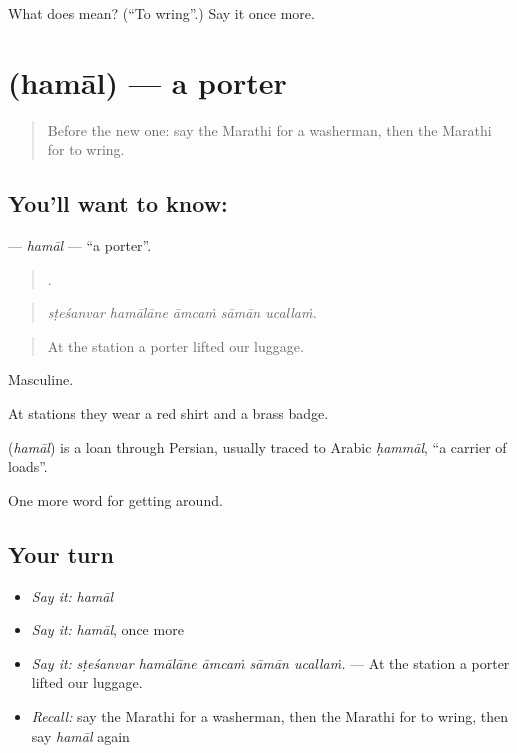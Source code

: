 \begin{tcolorbox}[breakable,colback=teal!4,colframe=teal!35!black,title={Before you move on}]
What does  mean? (\textquotedblleft{}To wring\textquotedblright{}.) Say it once more.
\end{tcolorbox}
\section[\texorpdfstring{\mr{हमाल} (hamāl)}{हमाल (hamāl)}]{ (hamāl) — a porter}

\label{lesson:MR-C416-hamal}



\begin{quote}
Before the new one: say the Marathi for a washerman, then the Marathi for to wring.
\end{quote}

\subsection*{You'll want to know: }
\textbf{} — \emph{hamāl} — \textquotedblleft{}a porter\textquotedblright{}.

\begin{quote}
    .
\end{quote}

\begin{quote}
\emph{sṭeśanvar hamālāne āmcaṁ sāmān ucallaṁ.}
\end{quote}

\begin{quote}
At the station a porter lifted our luggage.
\end{quote}

Masculine.

At stations they wear a red shirt and a brass badge.

\begin{cousinweb}
\textbf{} (\emph{hamāl}) is a loan through Persian, usually traced to Arabic \emph{ḥammāl}, \textquotedblleft{}a carrier of loads\textquotedblright{}.
\end{cousinweb}

\begin{grammarlens}[title={What you've built}]
One more word for getting around.
\end{grammarlens}

\subsection*{Your turn}
\begin{itemize}
\raggedright
  \item \emph{Say it:} \emph{hamāl}
  \item \emph{Say it:} \emph{hamāl}, once more
  \item \emph{Say it:} \emph{sṭeśanvar hamālāne āmcaṁ sāmān ucallaṁ.} — At the station a porter lifted our luggage.
  \item \emph{Recall:} say the Marathi for a washerman, then the Marathi for to wring, then say \emph{hamāl} again
\end{itemize}

